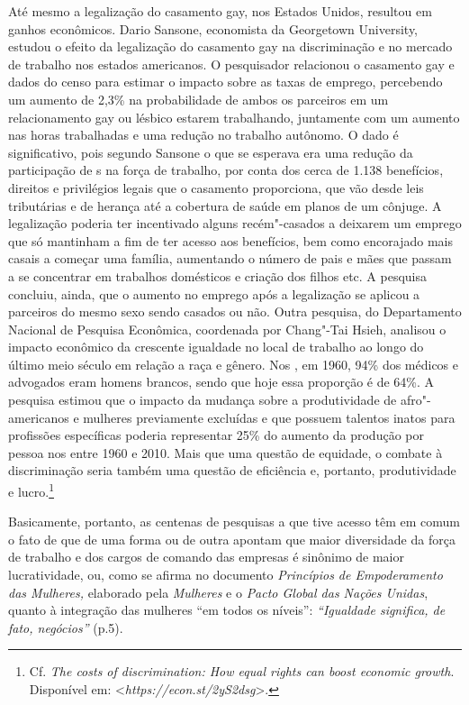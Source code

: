 Até mesmo a legalização do casamento gay, nos Estados Unidos, resultou
em ganhos econômicos. Dario Sansone, economista da Georgetown
University, estudou o efeito da legalização do casamento gay na
discriminação e no mercado de trabalho nos estados americanos. O
pesquisador relacionou o casamento gay e dados do censo para estimar o
impacto sobre as taxas de emprego, percebendo um aumento de 2,3\% na
probabilidade de ambos os parceiros em um relacionamento gay ou lésbico
estarem trabalhando, juntamente com um aumento nas horas trabalhadas e
uma redução no trabalho autônomo. O dado é significativo, pois segundo
Sansone o que se esperava era uma redução da participação de s na
força de trabalho, por conta dos cerca de 1.138 benefícios, direitos e
privilégios legais que o casamento proporciona, que vão desde leis
tributárias e de herança até a cobertura de saúde em planos de um
cônjuge. A legalização poderia ter incentivado alguns recém"-casados ​​a
deixarem um emprego que só mantinham a fim de ter acesso aos benefícios,
bem como encorajado mais casais a começar uma família, aumentando o
número de pais e mães que passam a se concentrar em trabalhos domésticos
e criação dos filhos etc. A pesquisa concluiu, ainda, que o aumento no
emprego após a legalização se aplicou a parceiros do mesmo sexo sendo
casados ​ou não. Outra pesquisa, do Departamento Nacional de Pesquisa
Econômica, coordenada por Chang"-Tai Hsieh, analisou o impacto econômico
da crescente igualdade no local de trabalho ao longo do último meio
século em relação a raça e gênero. Nos , em 1960, 94\% dos médicos e
advogados eram homens brancos, sendo que hoje essa proporção é de 64\%.
A pesquisa estimou que o impacto da mudança sobre a produtividade de
afro"-americanos e mulheres previamente excluídas e que possuem talentos
inatos para profissões específicas poderia representar 25\% do aumento
da produção por pessoa nos  entre 1960 e 2010. Mais que uma questão
de equidade, o combate à discriminação seria também uma questão de
eficiência e, portanto, produtividade e lucro.\footnote{Cf. \emph{The
  costs of discrimination: How equal rights can boost economic growth}.
  Disponível em: \textless{}\emph{https://econ.st/2yS2dsg}\textgreater{}.}

Basicamente, portanto, as centenas de pesquisas a que tive acesso têm em
comum o fato de que de uma forma ou de outra apontam que maior
diversidade da força de trabalho e dos cargos de comando das empresas é
sinônimo de maior lucratividade, ou, como se afirma no documento
\emph{Princípios de Empoderamento das Mulheres,} elaborado pela
\emph{ Mulheres} e o \emph{Pacto Global das Nações Unidas}, quanto à
integração das mulheres ``em todos os níveis'': \emph{``Igualdade
significa, de fato, negócios''} (p.5).

